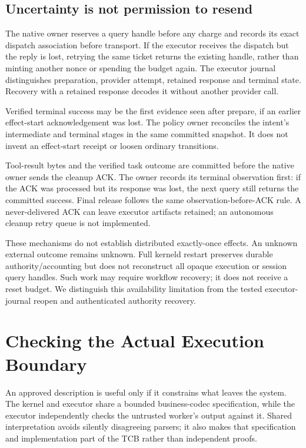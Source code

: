 \documentclass[letterpaper,twocolumn,10pt]{article}
\begin{document}
\subsection{Uncertainty is not permission to resend}

The native owner reserves a query handle before any charge and records its exact
dispatch association before transport. If the executor receives the dispatch but
the reply is lost, retrying the same ticket returns the existing handle, rather
than minting another nonce or spending the budget again. The executor journal
distinguishes preparation, provider attempt, retained response and terminal state.
Recovery with a retained response decodes it without another provider call.

Verified terminal success may be the first evidence seen after prepare, if an
earlier effect-start acknowledgement was lost. The policy owner reconciles the
intent's intermediate and terminal stages in the same committed snapshot.
It does not invent an effect-start receipt or loosen ordinary transitions.

Tool-result bytes and the verified task outcome are committed before the native
owner sends the cleanup ACK. The owner records its terminal observation first:
if the ACK was processed but its response was lost, the next query still returns
the committed success. Final release follows the same observation-before-ACK
rule. A never-delivered ACK can leave executor artifacts retained; an autonomous
cleanup retry queue is not implemented.

These mechanisms do not establish distributed exactly-once effects.
An unknown external outcome remains unknown. Full kerneld restart preserves
durable authority/accounting but does not reconstruct all opaque execution or
session query handles. Such work may require workflow recovery; it does not
receive a reset budget. We distinguish this availability limitation from the
tested executor-journal reopen and authenticated authority recovery.

\section{Checking the Actual Execution Boundary}
\label{sec:boundary}

An approved description is useful only if it constrains what leaves the system.
The kernel and executor share a bounded business-codec specification, while
the executor independently checks the untrusted worker's output against it.
Shared interpretation avoids silently disagreeing parsers; it also makes that
specification and implementation part of the TCB rather than independent proofs.
\end{document}
